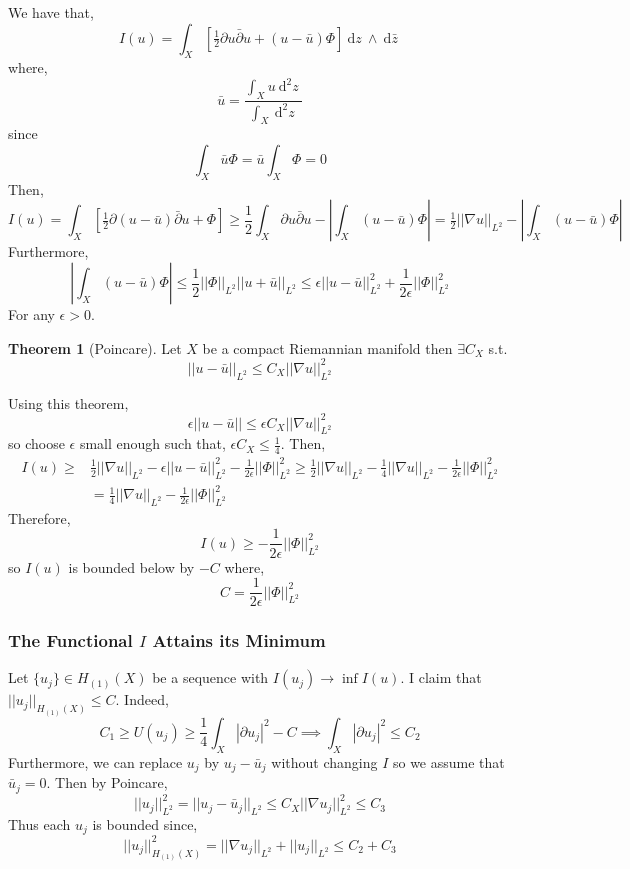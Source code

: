 \documentclass[12pt]{extarticle}
\renewcommand{\d}[1]{\: \mathrm{d}#1 \:}
\newcommand{\dn}[2]{\: \mathrm{d}^{#1} #2 \:}
\theoremstyle{definition}
\newtheorem{theorem}{Theorem}[section]
\begin{document}
We have that,
\[ I(u) = \int_X \left[ \tfrac{1}{2} \partial u \bar{\partial} u + (u - \bar{u}) \Phi \right] \d{z} \wedge \d{\bar{z}} \]
where,
\[ \bar{u} = \frac{\int_X u \dn{2}{z}}{\int_X \dn{2}{z}} \]
since
\[ \int_X \bar{u} \Phi  = \bar{u} \int_X \Phi = 0 \]
Then,
\[ I(u) = \int_X \left[ \tfrac{1}{2} \partial (u - \bar{u}) \bar{\partial} u + \Phi \right] \ge \frac{1}{2} \int_X \partial u \bar{\partial} u - \left| \int_X (u - \bar{u}) \Phi \right| = \tfrac{1}{2} || \nabla u ||_{L^2} - \left| \int_X (u - \bar{u}) \Phi \right| \]
Furthermore,
\[ \left| \int_X (u - \bar{u}) \Phi \right| \le \frac{1}{2} ||\Phi||_{L^2} ||u + \bar{u}||_{L^2} \le \epsilon ||u - \bar{u}||_{L^2}^2 + \frac{1}{2 \epsilon} || \Phi ||_{L^2}^2   \]
For any $\epsilon > 0$. 

\begin{theorem}[Poincare]
Let $X$ be a compact Riemannian manifold then $\exists C_X$ s.t.
 \[ || u - \bar{u} ||_{L^2} \le C_X || \nabla u ||^2_{L^2} \]
\end{theorem}
Using this theorem,
\[ \epsilon ||u - \bar{u}|| \le \epsilon C_X || \nabla u ||^2_{L^2} \]
so choose $\epsilon$ small enough such that, $\epsilon C_X \le \tfrac{1}{4}$. Then,
\begin{align*}
I(u) \ge & \tfrac{1}{2} || \nabla u ||_{L^2}  - \epsilon ||u - \bar{u}||_{L^2}^2 - \frac{1}{2 \epsilon} || \Phi ||_{L^2}^2 \ge \tfrac{1}{2} || \nabla u ||_{L^2}  - \tfrac{1}{4} || \nabla u ||_{L^2} - \frac{1}{2 \epsilon} || \Phi ||_{L^2}^2 
\\
& = \tfrac{1}{4} || \nabla u ||_{L^2} - \frac{1}{2 \epsilon} || \Phi ||_{L^2}^2 
\end{align*}
Therefore, 
\[ I(u) \ge - \frac{1}{2 \epsilon} || \Phi ||_{L^2}^2  \]
so $I(u)$ is bounded below by $-C$ where,
\[ C = \frac{1}{2 \epsilon} || \Phi ||_{L^2}^2 \]

\subsubsection{The Functional $I$ Attains its Minimum}

Let $\{ u_j \} \in H_{(1)}(X)$ be a sequence with $I(u_j) \to \inf{I(u)}$. I claim that $||u_j||_{H_{(1)}(X)} \le C$. Indeed,
\[ C_1 \ge U(u_j) \ge \frac{1}{4} \int_X |\partial u_j |^2 - C \implies \int_X |\partial u_j |^2 \le C_2 \] 
Furthermore, we can replace $u_j$ by $u_j - \bar{u}_j$ without changing $I$ so we assume that $\bar{u}_j = 0$. Then by Poincare,
\[ ||u_j||_{L^2}^2 = ||u_j - \bar{u}_j||_{L^2} \le C_X || \nabla u_j ||^2_{L^2} \le C_3 \]
Thus each $u_j$ is bounded since,
\[ || u_j ||_{H_{(1)}(X)}^2 = || \nabla u_j ||_{L^2} + || u_j ||_{L^2} \le C_2 + C_3 \]
\end{document}
